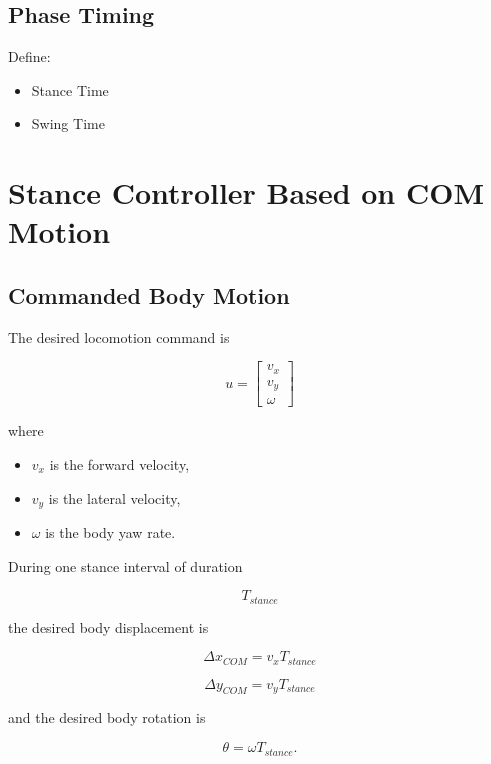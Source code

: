 \documentclass[11pt,a4paper]{report}
\begin{document}
\subsection{Phase Timing}

Define:

\begin{itemize}
\item Stance Time
\item Swing Time
\end{itemize}

\section{Stance Controller Based on COM Motion}

\subsection{Commanded Body Motion}

The desired locomotion command is

\[
u=
\begin{bmatrix}
v_x\\
v_y\\
\omega
\end{bmatrix}
\]

where

\begin{itemize}
\item $v_x$ is the forward velocity,
\item $v_y$ is the lateral velocity,
\item $\omega$ is the body yaw rate.
\end{itemize}

During one stance interval of duration

\[
T_{stance}
\]

the desired body displacement is

\[
\Delta x_{COM}
=
v_x T_{stance}
\]

\[
\Delta y_{COM}
=
v_y T_{stance}
\]

and the desired body rotation is

\[
\theta
=
\omega T_{stance}.
\]
\end{document}
